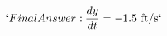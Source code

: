\documentclass[preview]{standalone}
\begin{document}
\begin{align*}
`Final Answer: \frac{dy}{dt} = -1.5 \text{ ft/s}`
\end{align*}
\end{document}
